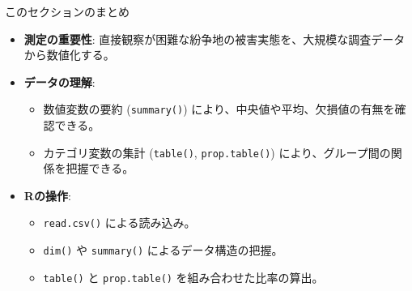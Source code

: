 \documentclass[
  ignorenonframetext,
]{beamer}
\providecommand{\tightlist}{%
  \setlength{\itemsep}{0pt}\setlength{\parskip}{0pt}}
\begin{document}
\begin{frame}[fragile]{このセクションのまとめ}
\protect\hypertarget{ux3053ux306eux30bbux30afux30b7ux30e7ux30f3ux306eux307eux3068ux3081}{}
\begin{itemize}
\tightlist
\item
  \textbf{測定の重要性}:
  直接観察が困難な紛争地の被害実態を、大規模な調査データから数値化する。
\item
  \textbf{データの理解}:

  \begin{itemize}
  \tightlist
  \item
    数値変数の要約 (\texttt{summary()})
    により、中央値や平均、欠損値の有無を確認できる。
  \item
    カテゴリ変数の集計 (\texttt{table()}, \texttt{prop.table()})
    により、グループ間の関係を把握できる。
  \end{itemize}
\item
  \textbf{Rの操作}:

  \begin{itemize}
  \tightlist
  \item
    \texttt{read.csv()} による読み込み。
  \item
    \texttt{dim()} や \texttt{summary()} によるデータ構造の把握。
  \item
    \texttt{table()} と \texttt{prop.table()} を組み合わせた比率の算出。
  \end{itemize}
\end{itemize}
\end{frame}
\end{document}
